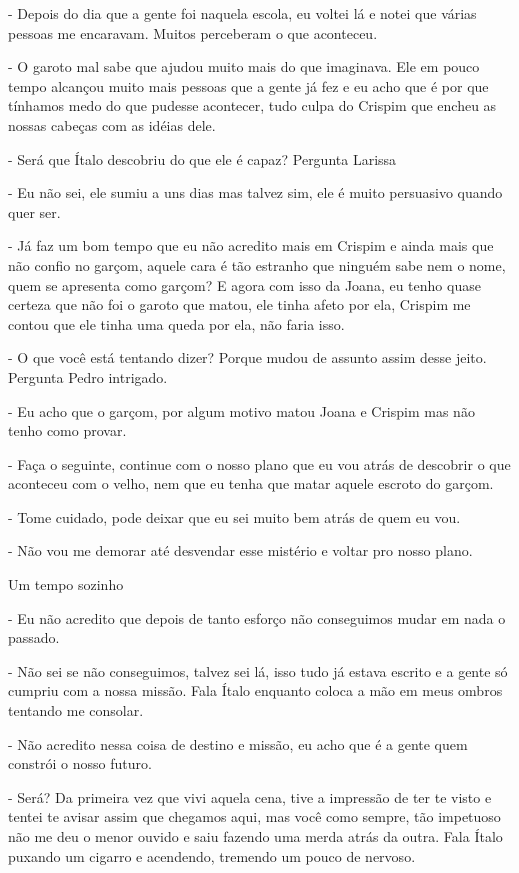 - Depois do dia que a gente foi naquela escola, eu voltei lá e notei que várias pessoas me encaravam. Muitos perceberam o que aconteceu.

- O garoto mal sabe que ajudou muito mais do que imaginava. Ele em pouco tempo alcançou muito mais pessoas que a gente já fez e eu acho que é por que tínhamos medo do que pudesse acontecer, tudo culpa do Crispim que encheu as nossas cabeças com as idéias dele.

- Será que Ítalo descobriu do que ele é capaz? Pergunta Larissa

- Eu não sei, ele sumiu a uns dias mas talvez sim, ele é muito persuasivo quando quer ser.

- Já faz um bom tempo que eu não acredito mais em Crispim e ainda mais que não confio no garçom, aquele cara é tão estranho que ninguém sabe nem o nome, quem se apresenta como garçom? E agora com isso da Joana, eu tenho quase certeza que não foi o garoto que matou, ele tinha afeto por ela, Crispim me contou que ele tinha uma queda por ela, não faria isso.

- O que você está tentando dizer? Porque mudou de assunto assim desse jeito. Pergunta Pedro intrigado.

- Eu acho que o garçom, por algum motivo matou Joana e Crispim  mas não tenho como provar.

- Faça o seguinte, continue com o nosso plano que eu vou atrás de descobrir o que aconteceu com o velho, nem que eu tenha que matar aquele escroto do garçom.

- Tome cuidado, pode deixar que eu sei muito bem atrás de quem eu vou.

- Não vou me demorar até desvendar esse mistério e voltar pro nosso plano.



Um tempo sozinho



- Eu não acredito que depois de tanto esforço não conseguimos mudar em nada o passado.

- Não sei se não conseguimos, talvez sei lá, isso tudo já estava escrito e a gente só cumpriu com a nossa missão. Fala Ítalo enquanto coloca a mão em meus ombros tentando me consolar.

- Não acredito nessa coisa de destino e missão, eu acho que é a gente quem constrói o nosso futuro.

- Será? Da primeira vez que vivi aquela cena, tive a impressão de ter te visto e tentei te avisar assim que chegamos aqui, mas você como sempre, tão impetuoso não me deu o menor ouvido e saiu fazendo uma merda atrás da outra. Fala Ítalo puxando um cigarro e acendendo, tremendo um pouco de nervoso.

